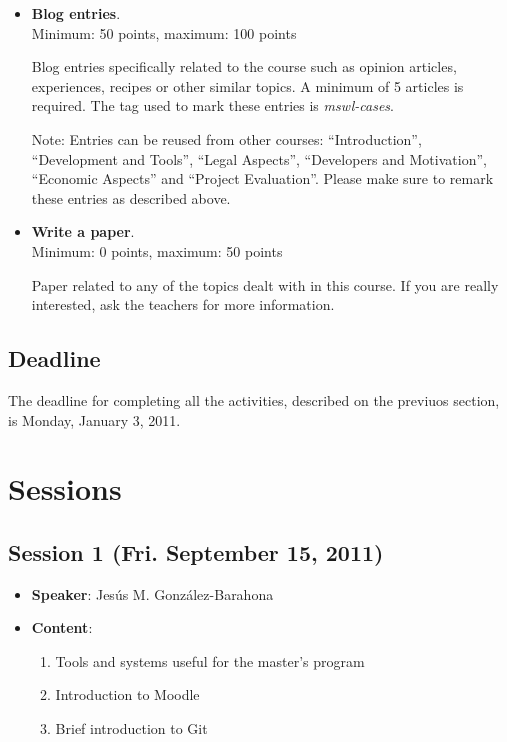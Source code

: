 \documentclass[a4paper]{article}
\begin{document}
\begin{itemize}

\item \textbf{Blog entries}. \\
  Minimum: 50 points, maximum: 100 points

  Blog entries specifically related to the course such as opinion articles, experiences, 
recipes or other similar topics. A minimum of 5 articles is required. The tag used to mark
these entries is \textit{mswl-cases}.

 Note: Entries can be reused from other courses: ``Introduction'', ``Development and Tools'',
``Legal Aspects'', ``Developers and Motivation'', ``Economic Aspects'' and ``Project Evaluation''. 
Please make sure to remark these entries as described above.

\item \textbf{Write a paper}. \\
  Minimum: 0 points, maximum: 50 points

  Paper related to any of the topics dealt with in this course. If you are really interested, ask the teachers for more information.

\end{itemize}

\subsection{Deadline}

The deadline for completing all the activities, described on the previuos section, is Monday, January 3, 2011.

\section{Sessions}

\subsection{Session 1 (Fri. September 15, 2011)}

\begin{itemize}
 \item \textbf{Speaker}: Jesús M. González-Barahona

 \item \textbf{Content}:

  \begin{enumerate}
   \item Tools and systems useful for the master's program
   \item Introduction to Moodle
   \item Brief introduction to Git
  \end{enumerate}

\end{itemize}
\end{document}
